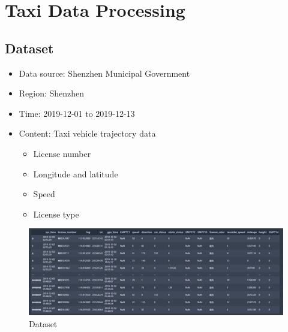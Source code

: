 \documentclass[fontset=none]{ctexart}
\theoremstyle{definition}
\theoremstyle{remark}
\begin{document}
\clearpage
\section{Taxi Data Processing}
\subsection{Dataset}
\begin{itemize}
  \item Data source: Shenzhen Municipal Government 
  \item Region: Shenzhen
  \item Time: 2019-12-01 to 2019-12-13
  \item Content: Taxi vehicle trajectory data
    \begin{itemize}
      \item License number
      \item Longitude and latitude
      \item Speed
      \item License type
    \end{itemize}
\end{itemize}

\begin{figure}[htb]
  \centering
  \includegraphics[width=\textwidth]{images/7-2-1.png}
  \caption{Dataset}
  \label{fig: 721}
\end{figure}
\end{document}
